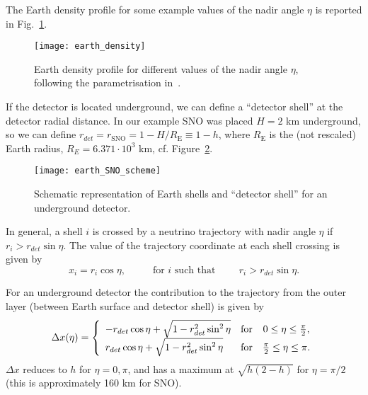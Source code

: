 \documentclass[11pt,a4paper]{article}
\begin{document}
The Earth density profile for some example values of the nadir angle $\eta$ is reported in Fig.~\ref{fig:earth_density}.

\begin{figure}[ht]
	\texttt{[image: earth\_density]}
	\caption{Earth density profile for different values of the nadir angle $\eta$, following the parametrisation in~\cite{Lisi:1997yc}.}
	\label{fig:earth_density}
\end{figure}

If the detector is located underground, we can define a ``detector shell'' at the detector radial distance. In our example SNO was placed $H=2$ km underground, so we can define $r_{det} = r_\text{SNO} = 1 - H /R_\text{E} \equiv 1 - h$, where $R_\text{E}$ is the (not rescaled) Earth radius, $R_E = 6.371 \cdot 10^3$ km, cf. Figure~\ref{fig:scheme_detector_shell}.

\begin{figure}[ht]
	\texttt{[image: earth\_SNO\_scheme]}
	\caption{Schematic representation of Earth shells and ``detector shell'' for an underground detector.}
	\label{fig:scheme_detector_shell}
\end{figure} 

In general, a shell $i$ is crossed by a neutrino trajectory with nadir angle $\eta$ if $r_i > r_{det} \sin \eta$. The value of the trajectory coordinate at each shell crossing is given by 
\begin{equation}
	x_i = r_i \cos\eta, \hspace{1cm} \text{ for $i$ such that} \hspace{1cm} r_i > r_{det} \sin \eta.
\end{equation}

For an underground detector the contribution to the trajectory from the outer layer (between Earth surface and detector shell) is given by
\begin{equation}
	 \Delta x(\eta) = \left\{ \begin{array}{l c c}
		-r_{det} \cos\eta + \sqrt{1 - r_{det}^2 \sin^2 \eta} & \text{for} & 0 \leq \eta \leq \frac{\pi}{2}, \\
		r_{det} \cos\eta + \sqrt{1 - r_{det}^2 \sin^2 \eta} & \text{for} & \frac{\pi}{2} \leq \eta \leq \pi.
	\end{array} \right.
\end{equation}
$\Delta x$ reduces to $h$ for $\eta=0, \pi$, and has a maximum at $\sqrt{h(2-h)}$ for $\eta=\pi/2$ (this is approximately 160 km for SNO).
\end{document}
